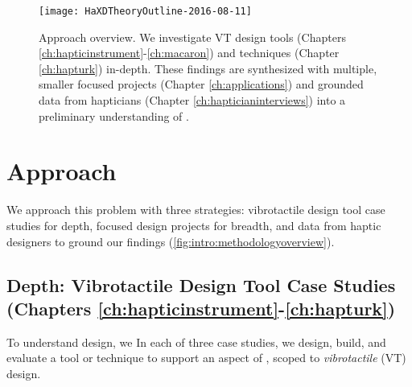 \begin{figure}[htbp]
\begin{center}
\texttt{[image: HaXDTheoryOutline-2016-08-11]}
\caption{Approach overview. We investigate VT design tools (Chapters \ref{ch:hapticinstrument}-\ref{ch:macaron}) and techniques (Chapter \ref{ch:hapturk}) in-depth. These findings are synthesized with multiple, smaller focused projects (Chapter \ref{ch:applications}) and grounded data from hapticians (Chapter \ref{ch:hapticianinterviews}) into a preliminary understanding of \haxd.}
\label{fig:intro:methodologyoverview}
\end{center}
\end{figure}



\section{Approach}
We approach this problem with three strategies: vibrotactile design tool case studies for depth,  %
focused design projects for breadth, and data from haptic designers to ground our findings  (\autoref{fig:intro:methodologyoverview}).

\subsection{Depth: Vibrotactile Design Tool Case Studies (Chapters \ref{ch:hapticinstrument}-\ref{ch:hapturk})}
To understand design, we 
In each of three case studies, we design, build, and evaluate a tool or technique to support an aspect of \haxd, scoped to \emph{vibrotactile} (VT) design.


